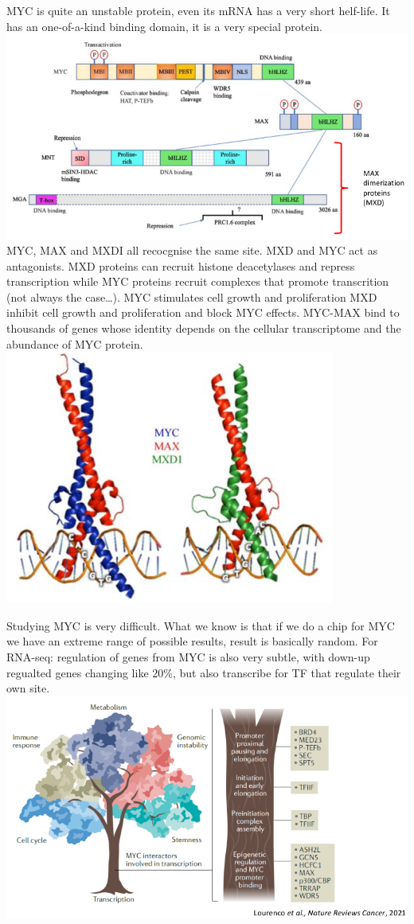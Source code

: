 MYC is quite an unstable protein, even its mRNA has a very short helf-life. It has an one-of-a-kind binding domain, it is a very special protein.
\includegraphics{../_resources/01adbb32a69ee3baec1bf9bddd890f52.png}
MYC, MAX and MXDI all recocgnise the same site.
MXD and MYC act as antagonists. MXD proteins can recruit histone deacetylases and repress transcription while MYC proteins recruit complexes that promote transcrition (not always the case\ldots). MYC stimulates cell growth and proliferation MXD inhibit cell growth and proliferation and block MYC effects.
MYC-MAX bind to thousands of genes whose identity depends on the cellular transcriptome and the abundance of MYC protein.
\includegraphics{../_resources/017e543a7782177edd93188be60ae382.png}

Studying MYC is very difficult. What we know is that if we do a chip for MYC we have an extreme range of possible results, result is basically random. For RNA-seq: regulation of genes from MYC is also very subtle, with down-up regualted genes changing like 20\%, but also transcribe for TF that regulate their own site.
\includegraphics{../_resources/e218faf59750ef1a90a9e45629f08973.png}


